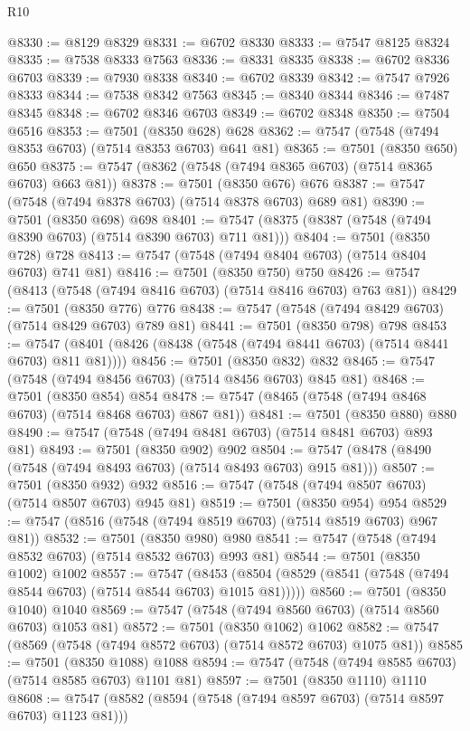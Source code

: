 \begin{lexlean}{R10}
\begin{coremodule}
{{{{{{{{{{{{{{{{{{{{{{{{{{{{{{{{{{{{{{{{{{{{{{{{{{{{{{{{{{{{{{{{{{{{{{{{{{{{{{{{{{{{@8330 := @8129 @8329
@8331 := @6702 @8330
@8333 := @7547 @8125 @8324
@8335 := @7538 @8333 @7563
@8336 := @8331 @8335
@8338 := @6702 @8336 @6703
@8339 := @7930 @8338
@8340 := @6702 @8339
@8342 := @7547 @7926 @8333
@8344 := @7538 @8342 @7563
@8345 := @8340 @8344
@8346 := @7487 @8345
@8348 := @6702 @8346 @6703
@8349 := @6702 @8348
@8350 := @7504 @6516
@8353 := @7501 (@8350 @628) @628
@8362 := @7547 (@7548 (@7494 @8353 @6703) (@7514 @8353 @6703) @641 @81)
@8365 := @7501 (@8350 @650) @650
@8375 := @7547 (@8362 (@7548 (@7494 @8365 @6703) (@7514 @8365 @6703) @663 @81))
@8378 := @7501 (@8350 @676) @676
@8387 := @7547 (@7548 (@7494 @8378 @6703) (@7514 @8378 @6703) @689 @81)
@8390 := @7501 (@8350 @698) @698
@8401 := @7547 (@8375 (@8387 (@7548 (@7494 @8390 @6703) (@7514 @8390 @6703) @711 @81)))
@8404 := @7501 (@8350 @728) @728
@8413 := @7547 (@7548 (@7494 @8404 @6703) (@7514 @8404 @6703) @741 @81)
@8416 := @7501 (@8350 @750) @750
@8426 := @7547 (@8413 (@7548 (@7494 @8416 @6703) (@7514 @8416 @6703) @763 @81))
@8429 := @7501 (@8350 @776) @776
@8438 := @7547 (@7548 (@7494 @8429 @6703) (@7514 @8429 @6703) @789 @81)
@8441 := @7501 (@8350 @798) @798
@8453 := @7547 (@8401 (@8426 (@8438 (@7548 (@7494 @8441 @6703) (@7514 @8441 @6703) @811 @81))))
@8456 := @7501 (@8350 @832) @832
@8465 := @7547 (@7548 (@7494 @8456 @6703) (@7514 @8456 @6703) @845 @81)
@8468 := @7501 (@8350 @854) @854
@8478 := @7547 (@8465 (@7548 (@7494 @8468 @6703) (@7514 @8468 @6703) @867 @81))
@8481 := @7501 (@8350 @880) @880
@8490 := @7547 (@7548 (@7494 @8481 @6703) (@7514 @8481 @6703) @893 @81)
@8493 := @7501 (@8350 @902) @902
@8504 := @7547 (@8478 (@8490 (@7548 (@7494 @8493 @6703) (@7514 @8493 @6703) @915 @81)))
@8507 := @7501 (@8350 @932) @932
@8516 := @7547 (@7548 (@7494 @8507 @6703) (@7514 @8507 @6703) @945 @81)
@8519 := @7501 (@8350 @954) @954
@8529 := @7547 (@8516 (@7548 (@7494 @8519 @6703) (@7514 @8519 @6703) @967 @81))
@8532 := @7501 (@8350 @980) @980
@8541 := @7547 (@7548 (@7494 @8532 @6703) (@7514 @8532 @6703) @993 @81)
@8544 := @7501 (@8350 @1002) @1002
@8557 := @7547
    (@8453 (@8504 (@8529 (@8541 (@7548 (@7494 @8544 @6703) (@7514 @8544 @6703) @1015 @81)))))
@8560 := @7501 (@8350 @1040) @1040
@8569 := @7547 (@7548 (@7494 @8560 @6703) (@7514 @8560 @6703) @1053 @81)
@8572 := @7501 (@8350 @1062) @1062
@8582 := @7547 (@8569 (@7548 (@7494 @8572 @6703) (@7514 @8572 @6703) @1075 @81))
@8585 := @7501 (@8350 @1088) @1088
@8594 := @7547 (@7548 (@7494 @8585 @6703) (@7514 @8585 @6703) @1101 @81)
@8597 := @7501 (@8350 @1110) @1110
@8608 := @7547 (@8582 (@8594 (@7548 (@7494 @8597 @6703) (@7514 @8597 @6703) @1123 @81)))
}}}}}}}}}}}}}}}}}}}}}}}}}}}}}}}}}}}}}}}}}}}}}}}}}}}}}}}}}}}}}}}}}}}}}}}}}}}}}}}}}}}}
\end{coremodule}
\end{lexlean}
